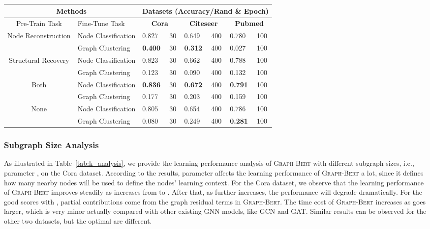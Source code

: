 \documentclass{article}
\newcommand{\our}{\textsc{Graph-Bert}}
\newcommand{\gcn}{\textsc{GCN}}
\newcommand{\gat}{\textsc{GAT}}
\begin{document}
\begin{table*}[t]
\caption{Performance comparison of {\our} on fine-tuning tasks with/without pre-training. For all the models shown here, we will only use  of the normal training max epochs as used by {\our} in Table~\ref{tab:node_classification}. For KMeans, the epoch denotes its max-iter parameter.}\label{tab:performance_summary}
\centering
\setlength{\tabcolsep}{3.5pt}
\begin{tabular}{|c|l|p{0.9cm}|p{1.2cm}|p{0.9cm}|p{1.2cm}|p{0.9cm}|p{1.2cm}| }
\hline
\multicolumn{2}{|c}{Methods } & \multicolumn{6}{|c|}{Datasets (Accuracy/Rand \& Epoch)} \\
\hline
Pre-Train Task & Fine-Tune Task & \multicolumn{2}{|c}{\textbf{Cora}} & \multicolumn{2}{|c}{\textbf{Citeseer}} & \multicolumn{2}{|c|}{\textbf{Pubmed}} \\
\hline 
\hline 
\multirow{2}{*}{Node Reconstruction}
&Node Classification&0.827 &30  &0.649 &400 &0.780 &100 \\
\cline{2-8}
&Graph Clustering&\textbf{0.400} &30  &\textbf{0.312} &400 &0.027 &100 \\
\hline
\hline
\multirow{2}{*}{Structural Recovery}
&Node Classification&0.823 &30  &0.662 &400 &0.788 &100 \\
\cline{2-8}
&Graph Clustering&0.123 &30  &0.090 &400 &0.132 &100 \\
\hline
\hline
\multirow{2}{*}{Both}
&Node Classification&\textbf{0.836} &30  &\textbf{0.672} &400 &\textbf{0.791} &100 \\
\cline{2-8}
&Graph Clustering&0.177 &30  &0.203 &400 &0.159 & 100 \\
\hline
\hline
\multirow{2}{*}{None}
&Node Classification&0.805 &30  &0.654 &400&0.786 &100 \\
\cline{2-8}
&Graph Clustering&0.080 &30  &0.249 &400 &\textbf{0.281} &100 \\
\hline
\end{tabular}
\end{table*}


\subsubsection{Subgraph Size  Analysis}

As illustrated in Table~\ref{tab:k_analysis}, we provide the learning performance analysis of {\our} with different subgraph sizes, i.e., parameter , on the Cora dataset. According to the results, parameter  affects the learning performance of {\our} a lot, since it defines how many nearby nodes will be used to define the nodes' learning context. For the Cora dataset, we observe that the learning performance of {\our} improves steadily as  increases from  to . After that, as  further increases, the performance will degrade dramatically. For the good scores with , partial contributions come from the graph residual terms in {\our}. The time cost of {\our} increases as  goes larger, which is very minor actually compared with other existing GNN models, like {\gcn} and {\gat}. Similar results can be observed for the other two datasets, but the optimal  are different.
\end{document}

